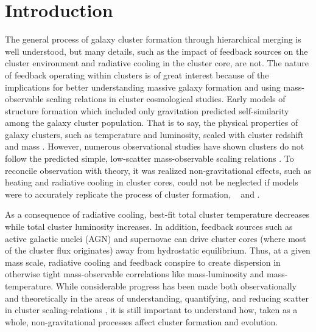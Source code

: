 \documentclass[apj]{emulateapj}
\begin{document}
\section{Introduction}
\label{sec:intro}

The general process of galaxy cluster formation through hierarchical
merging is well understood, but many details, such as the impact of
feedback sources on the cluster environment and radiative cooling in
the cluster core, are not. The nature of feedback operating within
clusters is of great interest because of the implications for better
understanding massive galaxy formation and using mass-observable
scaling relations in cluster cosmological studies. Early models of
structure formation which included only gravitation predicted
self-similarity among the galaxy cluster population. That is to say,
the physical properties of galaxy clusters, such as temperature and
luminosity, scaled with cluster redshift and mass \citep{kaiser86,
1991ApJ...383...95E, nfw1, nfw2, 1996ApJ...469..494E,
1997MNRAS.292..289E, 1997ApJ...480...36T, 1998ApJ...503..569E,
1998ApJ...495...80B}. However, numerous observational studies have
shown clusters do not follow the predicted simple, low-scatter
mass-observable scaling relations \citep{edge91, 1998MNRAS.297L..57A,
1998ApJ...504...27M, 1999MNRAS.305..631A, 1999ApJ...520...78H,
2000ApJ...536...73N, 2001A&A...368..749F}. To reconcile observation
with theory, it was realized non-gravitational effects, such as
heating and radiative cooling in cluster cores, could not be neglected
if models were to accurately replicate the process of cluster
formation, \eg\ \citet{2000ApJ...532...17L} and
\citet{2002MNRAS.336..409B}.

As a consequence of radiative cooling, best-fit total cluster
temperature decreases while total cluster luminosity increases. In
addition, feedback sources such as active galactic nuclei (AGN) and
supernovae can drive cluster cores (where most of the cluster flux
originates) away from hydrostatic equilibrium. Thus, at a given mass
scale, radiative cooling and feedback conspire to create dispersion in
otherwise tight mass-observable correlations like mass-luminosity and
mass-temperature. While considerable progress has been made both
observationally and theoretically in the areas of understanding,
quantifying, and reducing scatter in cluster scaling-relations
\citep{1996ApJ...458...27B, 2005ApJ...624..606J, kravtsov06, nagai07,
VV08}, it is still important to understand how, taken as a whole,
non-gravitational processes affect cluster formation and evolution.
\end{document}
